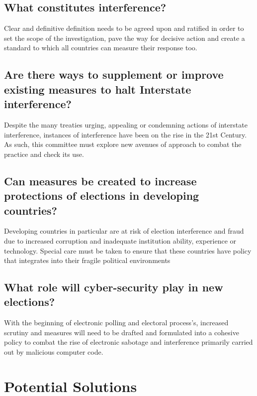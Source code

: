 \documentclass[11pt,a4paper]{report}
\begin{document}
\subsection{What constitutes interference?}

Clear and definitive definition needs to be agreed upon and ratified in order to set the scope of the investigation, pave the way for decisive action and create a standard to which all countries can measure their response too.

\subsection{Are there ways to supplement or improve existing measures to halt Interstate interference?}

Despite the many treaties urging, appealing or condemning actions of interstate interference, instances of interference have been on the rise in the 21st Century. As such, this committee must explore new avenues of approach to combat the practice and check its use.

\subsection{Can measures be created to increase protections of elections in developing countries?}
Developing countries in particular are at risk of election interference and fraud due to increased corruption and inadequate institution ability, experience or technology. Special care must be taken to ensure that these countries have policy that integrates into their fragile political environments

\subsection{What role will cyber-security play in new elections?}
With the beginning of electronic polling and electoral process's, increased scrutiny and measures will need to be drafted and formulated into a cohesive policy to combat the rise of electronic sabotage and interference primarily carried out by malicious computer code.

\section{Potential Solutions}
\end{document}
